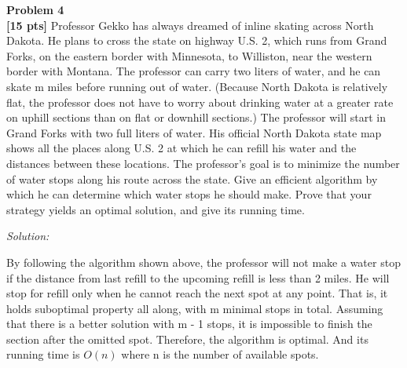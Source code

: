 \documentclass{article}
\newenvironment{problem}[2][Problem]
    { \begin{mdframed}[backgroundcolor=gray!20] \textbf{#1 #2} \\}
    {  \end{mdframed}}
\newenvironment{solution}
    {\textit{Solution:}}
    {}
\begin{document}
\newpage
\begin{problem}{4}
\textbf{[15 pts]} 
Professor Gekko has always dreamed of inline skating across North Dakota. He plans to cross the state on highway U.S. 2, which runs from Grand Forks, on the eastern border with Minnesota, to Williston, near the western border with Montana.
\newline
The professor can carry two liters of water, and he can skate m miles before running out of water. (Because North Dakota is relatively flat, the professor does not have to worry about drinking water at a greater rate on uphill sections than on flat or downhill sections.) The professor will start in Grand Forks with two full liters of water. His official North Dakota state map shows all the places along U.S. 2 at which he can refill his water and the distances between these locations.
\newline
The professor’s goal is to minimize the number of water stops along his route across the state. Give an efficient algorithm by which he can determine which water stops he should make. Prove that your strategy yields an optimal solution, and give its running time.
\end{problem}
\begin{solution}
	\begin{algorithm}
	\end{algorithm}
	\newline
	By following the algorithm shown above, the professor will not make a water stop if the distance from last refill to the upcoming refill is less than 2 miles. He will stop for refill only when he cannot reach the next spot at any point. That is, it holds suboptimal property all along, with m minimal stops in total. Assuming that there is a better solution with m - 1 stops, it is impossible to finish the section after the omitted spot. Therefore, the algorithm is optimal. And its running time is $O(n)$ where n is the number of available spots.
\end{solution}
\end{document}
